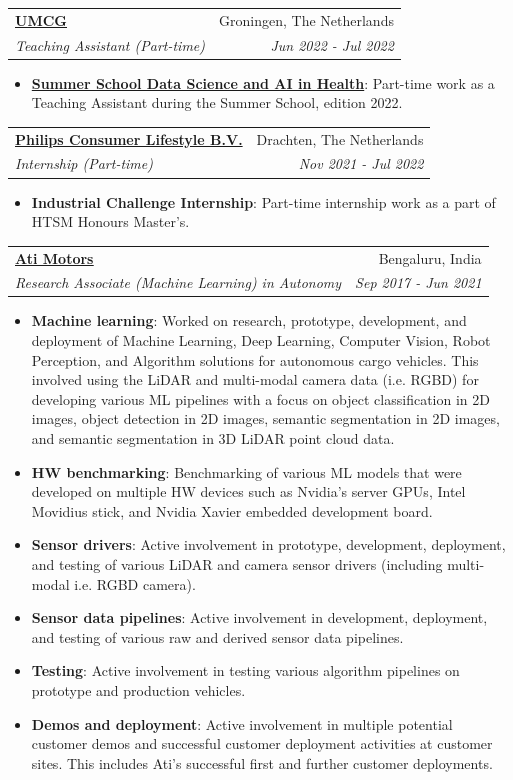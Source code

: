 \documentclass[letterpaper,12pt]{article}
\makeatletter
\newcommand{\resumeItem}[2]{
    \item\small{
        \textbf{#1}{: #2 \vspace{-2pt}}
    }
}
\newcommand{\resumeSubheading}[4]{
    \vspace{-1pt}\item
    \begin{tabular*}{0.97\textwidth}{l@{\extracolsep{\fill}}r}
        \textbf{#1} & #2 \\
        \textit{\small#3} & \textit{\small #4} \\
    \end{tabular*}\vspace{-5pt}
}
\newcommand{\resumeSubHeadingListStart}{\begin{itemize}[leftmargin=*]}
\newcommand{\resumeSubHeadingListEnd}{\end{itemize}}
\makeatother
\begin{document}
        \resumeSubheading{\underline{\href{https://www.umcg.nl/}{UMCG}}}{Groningen, The Netherlands}{Teaching Assistant (Part-time)}{Jun 2022 - Jul 2022}
            \resumeSubHeadingListStart
                \resumeItem{\href{https://www.rug.nl/research/gradschool-medical-sciences/summer-schools/data-science-and-ai/}{Summer School Data Science and AI in Health}}{Part-time work as a Teaching Assistant during the Summer School, edition 2022.}
            \resumeSubHeadingListEnd

        \resumeSubheading{\underline{{Philips Consumer Lifestyle B.V.}}}{Drachten, The Netherlands}{Internship (Part-time)}{Nov 2021 - Jul 2022}
            \resumeSubHeadingListStart
                \resumeItem{{Industrial Challenge Internship}}{Part-time internship work as a part of HTSM Honours Master's.}
            \resumeSubHeadingListEnd

        \resumeSubheading{\underline{\href{https://www.atimotors.com/}{Ati Motors}}}{Bengaluru, India}{Research Associate (Machine Learning) in Autonomy}{Sep 2017 - Jun 2021}
            \resumeSubHeadingListStart
                \resumeItem{Machine learning}
                {Worked on research, prototype, development, and deployment of Machine Learning, Deep Learning, Computer Vision, Robot Perception, and Algorithm solutions for autonomous cargo vehicles. This involved using the LiDAR and multi-modal camera data (i.e. RGBD) for developing various ML pipelines with a focus on object classification in 2D images, object detection in 2D images, semantic segmentation in 2D images, and semantic segmentation in 3D LiDAR point cloud data.}
                \resumeItem{HW benchmarking}{Benchmarking of various ML models that were developed on multiple HW devices such as Nvidia's server GPUs, Intel Movidius stick, and Nvidia Xavier embedded development board.}
                \resumeItem{Sensor drivers}{Active involvement in prototype, development, deployment, and testing of various LiDAR and camera sensor drivers (including multi-modal i.e. RGBD camera).}
                \resumeItem{Sensor data pipelines}{Active involvement in development, deployment, and testing of various raw and derived sensor data pipelines.}
                \resumeItem{Testing}{Active involvement in testing various algorithm pipelines on prototype and production vehicles.}
                \resumeItem{Demos and deployment}{Active involvement in multiple potential customer demos and successful customer deployment activities at customer sites. This includes Ati's successful first and further customer deployments.}
            \resumeSubHeadingListEnd
\end{document}
